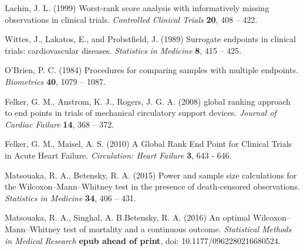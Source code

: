 \documentclass[bimj,fleqn]{w-art}\usepackage[]{graphicx}\usepackage[]{color}
\theoremstyle{plain}
\theoremstyle{definition}
\begin{document}
\begin{thebibliography}{10}

Lachin, J. L. (1999) Worst-rank score analysis with informatively missing observations in clinical trials.  \textit{Controlled Clinical Trials} \textbf{20}, 408 – 422.

Wittes, J., Lakatos, E., and Probstfield, J. (1989) Surrogate endpoints in clinical trials: cardiovascular diseases. \textit{Statistics in Medicine} \textbf{8}, 415 – 425.

 O'Brien, P. C. (1984) Procedures for comparing samples with multiple endpoints. \textit{Biometrics} \textbf{40}, 1079 – 1087.

 Felker, G. M., Anstrom, K. J., Rogers, J. G. A. (2008) global ranking approach to end points in trials of mechanical circulatory support devices. \textit{Journal of Cardiac Failure} \textbf{14}, 368 – 372.

 Felker, G. M., Maisel, A. S. (2010) A Global Rank End Point for Clinical Trials in Acute Heart Failure. \textit{Circulation: Heart Failure} \textbf{3}, 643 - 646.

 Matsouaka, R. A., Betensky, R. A. (2015) Power and sample size calculations for the Wilcoxon–Mann–Whitney test in the presence of death-censored observations. \textit{Statistics in Medicine} \textbf{34}, 406 – 431.

 Matsouaka, R. A., Singhal, A. B.Betensky, R. A. (2016) An optimal Wilcoxon–Mann–Whitney test of mortality and a continuous outcome. \textit{Statistical Methods in Medical Research} \textbf{epub ahead of print},  doi: 10.1177/0962280216680524.


\end{thebibliography}
\phantom{aaaa}
\end{document}
